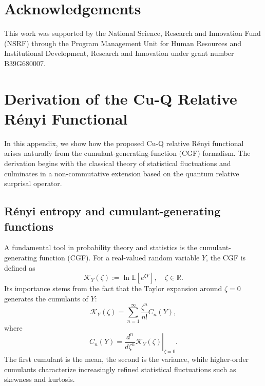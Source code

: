 \documentclass[a4paper, amsfonts, amssymb, amsmath, reprint, showkeys, nofootinbib, twoside, aps, pra]{revtex4-2}
\theoremstyle{definition}
\begin{document}
\section*{Acknowledgements} \label{sec:acknowledgements}
    This work was supported by the National Science, Research and Innovation Fund (NSRF) through the Program Management Unit for Human Resources and Institutional Development, Research and Innovation under grant number B39G680007.



\appendix 

\section{Derivation of the Cu-Q Relative Rényi Functional}
\label{app:derivation_cuq}

In this appendix, we show how the proposed Cu-Q relative Rényi functional arises naturally from the cumulant-generating-function (CGF) formalism. The derivation begins with the classical theory of statistical fluctuations and culminates in a non-commutative extension based on the quantum relative surprisal operator.

\subsection{Rényi entropy and cumulant-generating functions}

A fundamental tool in probability theory and statistics is the cumulant-generating function (CGF). For a real-valued random variable $Y$, the CGF is defined as
\begin{equation}
\mathcal K_Y(\zeta):=\ln\mathbb E\left[ e^{\zeta Y}\right],\quad\zeta\in\mathbb R.
\end{equation}
Its importance stems from the fact that the Taylor expansion around $\zeta=0$ generates the cumulants of $Y$:
\begin{equation}
\mathcal K_Y(\zeta)=\sum_{n=1}^{\infty} \frac{\zeta^n}{n!}
C_n(Y),
\end{equation}
where
\begin{equation}
C_n(Y)=\left.\frac{d^n}{d\zeta^n}\mathcal K_Y(\zeta)\right|_{\zeta=0}.
\end{equation}
The first cumulant is the mean, the second is the variance, while higher-order cumulants characterize increasingly refined statistical fluctuations such as skewness and kurtosis.
\end{document}
